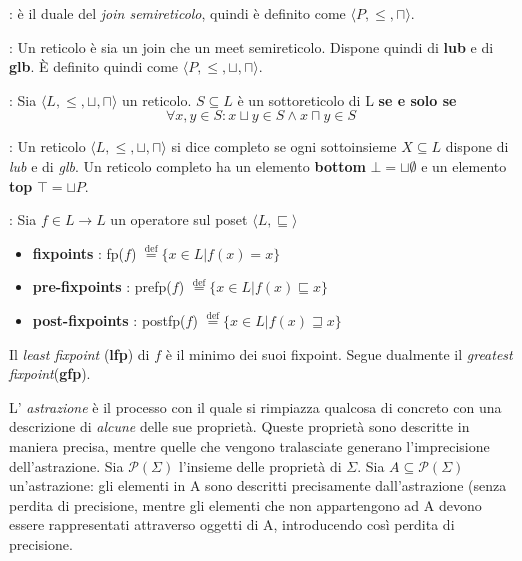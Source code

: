 \documentclass[a4paper,12pt,openany]{article}
\newcommand{\Pp}{\mathcal{P}}
\newenvironment{definition}[1][Definizione]{\begin{trivlist}
\item[\hskip \labelsep {\bfseries #1}]}{\end{trivlist}}
\begin{document}
    \begin{definition}[Meet semireticolo]: è il duale del \textit{join semireticolo}, quindi è definito come 
        $\langle P, \leq, \sqcap \rangle$.
    \end{definition}
    
    \begin{definition}[Reticolo]: Un reticolo è sia un join che un meet semireticolo. Dispone quindi di \textbf{lub}
            e di \textbf{glb}. È definito quindi come $\langle P, \leq, \sqcup, \sqcap \rangle$.
    \end{definition}
    
    \begin{definition}[Sottoreticolo]: Sia $\langle L, \leq, \sqcup, \sqcap \rangle$ un reticolo. $S \subseteq L$ è un 
        sottoreticolo di L \textbf{se e solo se} 
        $$\forall x,y \in S : x \sqcup y \in S \land x \sqcap y \in S$$
    \end{definition}
    
    \begin{definition}[Reticolo completo]: Un reticolo $\langle L, \leq, \sqcup, \sqcap \rangle$ si dice completo se
            ogni sottoinsieme $X \subseteq L$ dispone di \emph{lub} e di \emph{glb}. Un reticolo completo
            ha un elemento \textbf{bottom} $\bot = \sqcup \emptyset$ e un elemento \textbf{top} 
            $\top = \sqcup P$.
    \end{definition}
    
    \begin{definition}[Punti fissi]: Sia $f \in L \to L $ un operatore sul poset
            $\langle L, \sqsubseteq \rangle$
        \begin{itemize}
            \item \textbf{fixpoints} : fp($f$) $\overset{\mathrm{def}}{=} \{x \in L | f(x) = x\}$
            \item \textbf{pre-fixpoints} : prefp($f$) $\overset{\mathrm{def}}{=} \{x \in L | f(x) 
                \sqsubseteq x\}$
            \item \textbf{post-fixpoints} : postfp($f$) $\overset{\mathrm{def}}{=} \{x \in L | f(x) 
                \sqsupseteq x\}$
        \end{itemize}
            Il \emph{least fixpoint} (\textbf{lfp}) di $f$ è il minimo dei suoi fixpoint. Segue dualmente il 
            \emph{greatest fixpoint}(\textbf{gfp}).
    \end{definition}
    
    L' \emph{astrazione} è il processo con il quale si rimpiazza qualcosa di concreto con una descrizione di
    \emph{alcune} delle sue proprietà. Queste proprietà sono descritte in maniera precisa, mentre quelle
    che vengono tralasciate generano l'imprecisione dell'astrazione.
    \newline
    Sia $\Pp(\Sigma)$ l'insieme delle proprietà di $\Sigma$. Sia $A \subseteq\Pp(\Sigma)$ un'astrazione:
    gli elementi in A sono descritti precisamente dall'astrazione (senza perdita di precisione,
    mentre gli elementi che non appartengono ad A devono essere rappresentati attraverso oggetti di A,
    introducendo così perdita di precisione.
    
\end{document}

